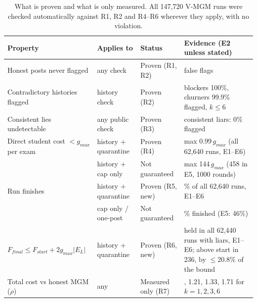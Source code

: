 \begin{table}[t]
\centering
\footnotesize
\caption{What is proven and what is only measured. All 147,720 V-MGM runs were checked automatically against R1, R2 and R4--R6 wherever they apply, with no violation.}
\label{tab:guarantees}
\begin{tabularx}{\linewidth}{>{\raggedright\arraybackslash}p{3.5cm}>{\raggedright\arraybackslash}p{2.6cm}>{\raggedright\arraybackslash}p{2.3cm}>{\raggedright\arraybackslash}X}
\toprule
Property & Applies to & Status & Evidence (E2 unless stated) \\
\midrule
Honest posts never flagged & any check & Proven (R1, R2) & 0 false flags \\
Contradictory histories flagged & history check & Proven (R2) & blockers 100\%, churners 99.9\% flagged, $k\le 6$ \\
Consistent lies undetectable & any public check & Proven (R3) & consistent liars: 0\% flagged \\
Direct student cost $< g_{max}$ per exam & history + quarantine & Proven (R4) & max 0.99$\,g_{max}$ (all 62,640 runs, E1--E6) \\
 & history + cap only & Not guaranteed & max 144$\,g_{max}$ (458 in E5, 1000 rounds) \\
Run finishes & history + quarantine & Proven (R5, new) & 100\% of all 62,640 runs, E1--E6 \\
 & cap only / one-post & Not guaranteed & 75\% finished (E5: 46\%) \\
$F_{final}\le F_{start}+2g_{max}|E_L|$ & history + quarantine & Proven (R6, new) & held in all 62,440 runs with liars, E1--E6; above start in 236, by $\le$20.8\% of the bound \\
Total cost vs honest MGM ($\rho$) & any & Measured only (R7) & 1.10, 1.21, 1.33, 1.71 for $k=1,2,3,6$ \\
\bottomrule
\end{tabularx}
\end{table}
